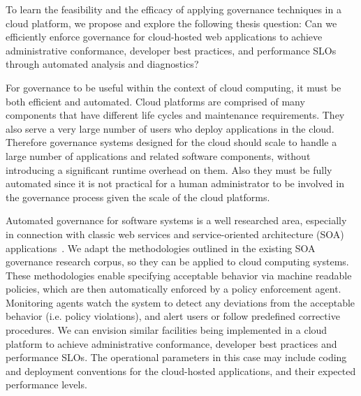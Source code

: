 To learn the feasibility and the efficacy of applying governance
techniques in a cloud platform, we propose and explore the following thesis
question:
Can we efficiently enforce governance for cloud-hosted web applications to achieve 
administrative conformance, developer best practices, and performance SLOs through 
automated analysis and diagnostics?

For governance to be
useful within the context of cloud computing, it must be both efficient and automated.
Cloud platforms are comprised of many components that have different life cycles
and maintenance requirements. 
They also serve a very large number of users who deploy applications in
the cloud. Therefore governance systems designed for the cloud should scale to handle a 
large number of applications and related software components,
without introducing a significant runtime overhead on them.
Also they must be fully automated since it is not practical for a human administrator to be
involved in the governance process given the scale of the cloud platforms.

Automated governance for software systems is a well researched area,
especially in connection with classic web services and service-oriented architecture 
(SOA) applications~\cite{gartner-soa-gov,soagov,Schepers:2008:LAS:1363686.1363932,5577268,4730489}. 
We adapt the methodologies outlined in the existing SOA governance research corpus, so
they can be applied to cloud computing systems.
These methodologies enable specifying
acceptable behavior via machine readable policies, which are then automatically enforced by
a policy enforcement agent. Monitoring agents watch the system to detect any deviations from
the acceptable behavior (i.e. policy violations), and alert users or follow predefined corrective
procedures. We can envision similar facilities being implemented in a cloud platform to 
achieve administrative conformance, developer best practices and performance SLOs. The operational
parameters in this case may include coding and deployment conventions for the cloud-hosted
applications, and their expected performance levels.

